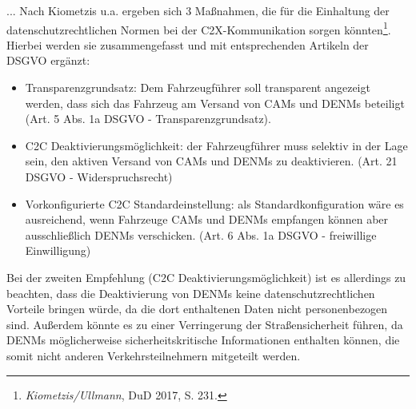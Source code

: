 ...
Nach Kiometzis u.a. \nocite{Kiometzis2017}ergeben sich 3 Maßnahmen, die für die Einhaltung der datenschutzrechtlichen Normen bei der C2X-Kommunikation sorgen könnten\footnote{\emph{Kiometzis/Ullmann}, DuD 2017, S. 231.}. Hierbei werden sie zusammengefasst und mit entsprechenden Artikeln der DSGVO ergänzt:
\begin{itemize}
	\item Transparenzgrundsatz: Dem Fahrzeugführer soll transparent angezeigt werden, dass sich das Fahrzeug am Versand von CAMs und DENMs beteiligt (Art. 5 Abs. 1a DSGVO - Transparenzgrundsatz). 
	\item C2C Deaktivierungsmöglichkeit: der Fahrzeugführer muss selektiv in der Lage sein, den aktiven Versand von CAMs und DENMs zu deaktivieren. (Art. 21 DSGVO - Widerspruchsrecht)
	\item Vorkonfigurierte C2C Standardeinstellung: als Standardkonfiguration wäre es ausreichend, wenn Fahrzeuge CAMs und DENMs empfangen können aber ausschließlich DENMs verschicken. (Art. 6 Abs. 1a DSGVO - freiwillige Einwilligung)
\end{itemize}

Bei der zweiten Empfehlung (C2C Deaktivierungsmöglichkeit)  ist es allerdings zu beachten, dass die Deaktivierung von DENMs keine datenschutzrechtlichen Vorteile bringen würde, da die dort enthaltenen Daten nicht personenbezogen sind. Außerdem könnte es zu einer Verringerung der Straßensicherheit führen, da DENMs möglicherweise sicherheitskritische Informationen enthalten können, die somit nicht anderen Verkehrsteilnehmern mitgeteilt werden. 

